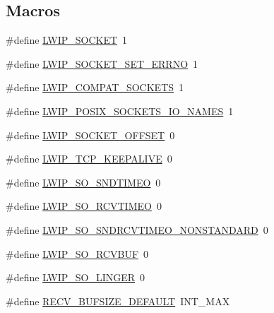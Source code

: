 \subsection*{Macros}
\begin{DoxyCompactItemize}
\item 
\#define \hyperlink{group__lwip__opts__socket_ga1cb62ce61ac39d7d6728ae5d3d3b927f}{L\+W\+I\+P\+\_\+\+S\+O\+C\+K\+ET}~1
\item 
\#define \hyperlink{group__lwip__opts__socket_ga7222c197f4ad4eb4f6c96bec865297a8}{L\+W\+I\+P\+\_\+\+S\+O\+C\+K\+E\+T\+\_\+\+S\+E\+T\+\_\+\+E\+R\+R\+NO}~1
\item 
\#define \hyperlink{group__lwip__opts__socket_gafed2811f031822ec5afa1ee211fb7447}{L\+W\+I\+P\+\_\+\+C\+O\+M\+P\+A\+T\+\_\+\+S\+O\+C\+K\+E\+TS}~1
\item 
\#define \hyperlink{group__lwip__opts__socket_ga484c38ab08f60d5b3335d23d31f9a402}{L\+W\+I\+P\+\_\+\+P\+O\+S\+I\+X\+\_\+\+S\+O\+C\+K\+E\+T\+S\+\_\+\+I\+O\+\_\+\+N\+A\+M\+ES}~1
\item 
\#define \hyperlink{group__lwip__opts__socket_gad0197c845fbb44c920b272f0fef3b57e}{L\+W\+I\+P\+\_\+\+S\+O\+C\+K\+E\+T\+\_\+\+O\+F\+F\+S\+ET}~0
\item 
\#define \hyperlink{group__lwip__opts__socket_ga8b9369ab260f032686a81c77c5b4db77}{L\+W\+I\+P\+\_\+\+T\+C\+P\+\_\+\+K\+E\+E\+P\+A\+L\+I\+VE}~0
\item 
\#define \hyperlink{group__lwip__opts__socket_ga1162cb685f202d9b21c11344b8209a58}{L\+W\+I\+P\+\_\+\+S\+O\+\_\+\+S\+N\+D\+T\+I\+M\+EO}~0
\item 
\#define \hyperlink{group__lwip__opts__socket_ga91af3ade95b20b9a60c65ed0380fa0ed}{L\+W\+I\+P\+\_\+\+S\+O\+\_\+\+R\+C\+V\+T\+I\+M\+EO}~0
\item 
\#define \hyperlink{group__lwip__opts__socket_ga5b115bacb569763d8a3889a12229e942}{L\+W\+I\+P\+\_\+\+S\+O\+\_\+\+S\+N\+D\+R\+C\+V\+T\+I\+M\+E\+O\+\_\+\+N\+O\+N\+S\+T\+A\+N\+D\+A\+RD}~0
\item 
\#define \hyperlink{group__lwip__opts__socket_ga06390cebcf4d13d3d47a11365e5fcd28}{L\+W\+I\+P\+\_\+\+S\+O\+\_\+\+R\+C\+V\+B\+UF}~0
\item 
\#define \hyperlink{group__lwip__opts__socket_gaa91292d5d014dc1c6f1c1f4166269a1d}{L\+W\+I\+P\+\_\+\+S\+O\+\_\+\+L\+I\+N\+G\+ER}~0
\item 
\#define \hyperlink{group__lwip__opts__socket_ga5dbd0a61f30ae6c6bfbda635095f138d}{R\+E\+C\+V\+\_\+\+B\+U\+F\+S\+I\+Z\+E\+\_\+\+D\+E\+F\+A\+U\+LT}~I\+N\+T\+\_\+\+M\+AX
\item 

\end{DoxyCompactItemize}
